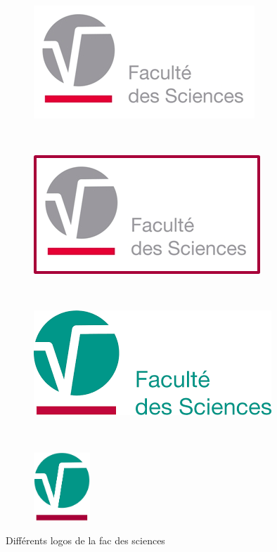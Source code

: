 \documentclass{umonsreport}
\begin{document}
\begin{figure}[H]
    \centering
    \begin{subfigure}[t]{.4\textwidth}
        \centering
        \includegraphics[width=\textwidth]{logos/FS.png}
    \end{subfigure}
    ~
    \begin{subfigure}[t]{.4\textwidth}
        \centering
        \includegraphics[width=\textwidth]{logos/FS2.png}
    \end{subfigure}
    ~ \bigskip
    \begin{subfigure}[t]{.4\textwidth}
        \centering
        \includegraphics[width=\textwidth]{logos/FS-colored.png}
    \end{subfigure}
    ~ 
    \begin{subfigure}[t]{.4\textwidth}
        \centering
        \includegraphics[height=7em]{logos/FS-colored-small.png}
    \end{subfigure}
    \caption{Diff\'erents logos de la fac des sciences}
    \label{fig:fs-logos}
\end{figure}
\end{document}
